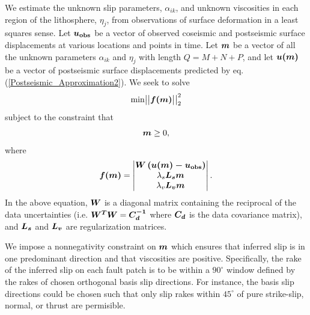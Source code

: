 \documentclass[extra]{gji}
\begin{document}
We estimate the unknown slip parameters, $\alpha_{ik}$, and unknown
viscosities in each region of the lithosphere, $\eta_j$, from
observations of surface deformation in a least squares sense. Let
$\mitbf{u_{\mathrm{obs}}}$ be a vector of observed coseismic and postseismic
surface displacements at various locations and points in time.  Let
$\mitbf{m}$ be a vector of all the unknown parameters $\alpha_{ik}$
and $\eta_j$ with length $Q=M+N+P$, and let $\mitbf{u(m)}$ be a vector
of postseismic surface displacements predicted by eq.
(\ref{Postseismic_Approximation2}). We seek to solve
\begin{equation}\label{Inverse_Problem}
  \mathrm{min}
  \big|\big|\mitbf{f(m)}\big|\big|_2^2
\end{equation}
subject to the constraint that
\begin{equation}
  \mitbf{m}\geq0,
\end{equation}
where 
\begin{equation}\label{ResidualFunction}
  \mitbf{f(m)} = 
    \begin{vmatrix}
      \mitbf{W\left(u(m)-u_{\mathrm{obs}}\right)}\\
      \lambda_s\mitbf{L_sm}\\
      \lambda_v\mitbf{L_vm}\\
    \end{vmatrix} .
\end{equation}  
In the above equation, $\mitbf{W}$ is a diagonal matrix containing the
reciprocal of the data uncertainties
(i.e. $\mitbf{W^TW}=\mitbf{C_d^{-1}}$ where $\mitbf{C_d}$ is
the data covariance matrix), and $\mitbf{L_s}$ and $\mitbf{L_v}$ are
regularization matrices.

We impose a nonnegativity constraint on $\mitbf{m}$ which ensures that
inferred slip is in one predominant direction and that viscosities are
positive.  Specifically, the rake of the inferred slip on each fault
patch is to be within a $90^\circ$ window defined by the rakes of
chosen orthogonal basis slip directions. For instance, the basis slip
directions could be chosen such that only slip rakes within $45^\circ$
of pure strike-slip, normal, or thrust are permisible.
\end{document}
